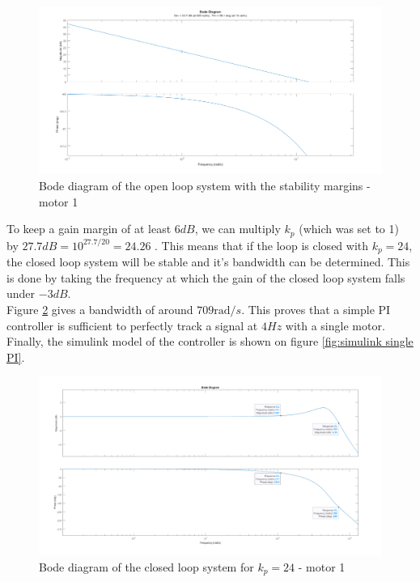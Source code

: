 \begin{figure}[H]
    \centering
    \includegraphics[width=\textwidth]{Pictures/bode_OL.png}
    \caption{Bode diagram of the open loop system with the stability margins - motor 1}
    \label{fig:OL bode}
\end{figure}

To keep a gain margin of at least $6 dB$, we can multiply $k_p$ (which was set to 1) by $27.7 dB = 10^{27.7/20} = 24.26$
. This means that if the loop is closed with $k_p = 24$, the closed loop system will be stable and it's bandwidth can
be determined. This is done by taking the frequency at which the gain of the closed loop system falls under $-3 dB$.\\ 
Figure \ref{fig:CL bode} gives a bandwidth of around $709 \text{rad}/s$.  This proves that a simple PI controller is 
sufficient to perfectly track a signal at $4 Hz$ with a single motor.\\
Finally, the simulink model of the controller is shown on figure \ref{fig:simulink single PI}.

\begin{figure}
    \centering
    \includegraphics[width=\textwidth]{Pictures/bode_CL.png}
    \caption{Bode diagram of the closed loop system for $k_p = 24$ - motor 1}
    \label{fig:CL bode}
\end{figure}

